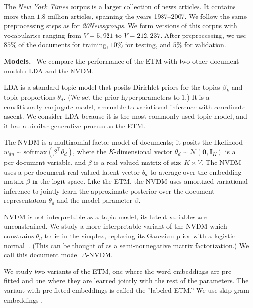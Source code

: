 \documentclass[11pt,a4paper]{article}
\DeclareRobustCommand{\parhead}[1]{\noindent\textbf{#1}~}
\newcommand{\bzero}{\mathbf{0}}
\newcommand{\bI}{\mathbf{I}}
\begin{document}
The \emph{New York Times} corpus is a larger collection of news
articles.  It contains more than $1.8$ million articles, spanning the
years 1987--2007.  We follow the same preprocessing steps as for
\emph{20Newsgroups}.  We form versions of this corpus with
vocabularies ranging from $V=5{,}921$ to $V=212{,}237$.  After
preprocessing, we use $85\%$ of the documents for training, $10\%$ for
testing, and $5\%$ for validation.


\parhead{Models.} We compare the performance of the \gls{ETM} with two
other document models: \gls{LDA} and the \gls{NVDM}.

\gls{LDA} \citep{blei2003latent} is a standard topic model that posits
Dirichlet priors for the topics $\beta_k$ and topic proportions
$\theta_d$. (We set the prior hyperparameters to $1$.) It is a
conditionally conjugate model, amenable to variational inference with
coordinate ascent.  We consider \gls{LDA} because it is the most
commonly used topic model, and it has a similar generative process as
the \gls{ETM}.



The \gls{NVDM} \citep{miao2016neural} is a multinomial factor model of
documents; it posits the likelihood
$w_{dn}\sim \text{softmax}(\beta^\top \theta_d)$, where the
$K$-dimensional vector $\theta_d\sim \mathcal{N}(\bzero, \bI_K)$ is a
per-document variable, and $\beta$ is a real-valued matrix of size
$K \times V$.  The \gls{NVDM} uses a per-document real-valued latent vector
$\theta_d$ to average over the embedding matrix $\beta$ in the logit
space.  Like the \gls{ETM}, the \gls{NVDM} uses amortized variational
inference to jointly learn the approximate posterior over the document
representation $\theta_d$ and the model parameter $\beta$.

\gls{NVDM} is not interpretable as a topic model; its latent variables
are unconstrained.  We study a more interpretable variant of the
\gls{NVDM} which constrains $\theta_d$ to lie in the simplex,
replacing its Gaussian prior with a logistic
normal~\citep{Aitchison:1980}.  (This can be thought of as a
semi-nonnegative matrix factorization.)  We call this document model
$\Delta$-\gls{NVDM}.

We study two variants of the \gls{ETM}, one where the word embeddings
are pre-fitted and one where they are learned jointly with the rest of
the parameters.  The variant with pre-fitted embeddings is called the
``labeled \gls{ETM}.'' We use skip-gram embeddings
\citep{mikolov2013distributed}.
\end{document}
